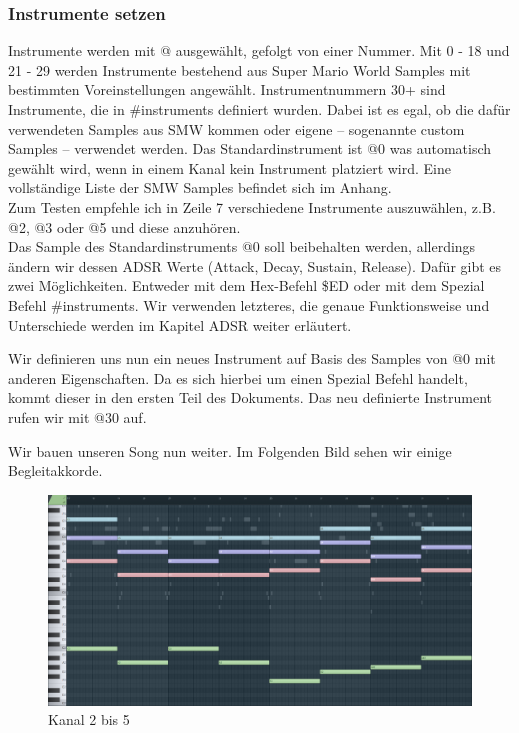 \subsubsection{Instrumente setzen}
Instrumente werden mit @ ausgewählt, gefolgt von einer Nummer. Mit 0 - 18 und 21 - 29 werden Instrumente bestehend aus Super Mario World Samples mit bestimmten Voreinstellungen angewählt. Instrumentnummern 30+ sind Instrumente, die in \#instruments definiert wurden. Dabei ist es egal, ob die dafür verwendeten Samples aus SMW kommen oder eigene -- sogenannte custom Samples -- verwendet werden. Das Standardinstrument ist @0 was automatisch gewählt wird, wenn in einem Kanal kein Instrument platziert wird.
Eine vollständige Liste der SMW Samples befindet sich im Anhang. \\
Zum Testen empfehle ich in Zeile 7 verschiedene Instrumente auszuwählen, z.B. @2, @3 oder @5 und diese anzuhören. \\
Das Sample des Standardinstruments @0 soll beibehalten werden, allerdings ändern wir dessen ADSR Werte (Attack, Decay, Sustain, Release). Dafür gibt es zwei Möglichkeiten. Entweder mit dem Hex-Befehl \$ED oder mit dem Spezial Befehl \#instruments. Wir verwenden letzteres, die genaue Funktionsweise und Unterschiede werden im Kapitel ADSR weiter erläutert.

\bigskip

Wir definieren uns nun ein neues Instrument auf Basis des Samples von @0 mit anderen Eigenschaften.
Da es sich hierbei um einen Spezial Befehl handelt, kommt dieser in den ersten Teil des Dokuments. Das neu definierte Instrument rufen wir mit @30 auf.

\medskip



\medskip

Wir bauen unseren Song nun weiter. Im Folgenden Bild sehen wir einige Begleitakkorde. 

\begin{figure}[htbp] \centering
	\includegraphics[width=.95\linewidth]{images/Strings.png}
	\caption{Kanal 2 bis 5}
	\label{NStrings}
\end{figure}

